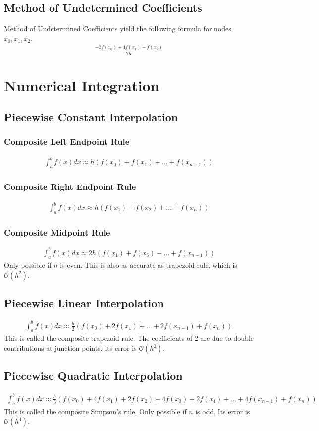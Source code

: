 \documentclass[12pt, letterpaper]{article}
\begin{document}
\subsection{Method of Undetermined Coefficients}
Method of Undetermined Coefficients yield the following formula for nodes $x_0,x_1,x_2$.
\begin{align*}
    \frac{-3f(x_0)+4f(x_1)-f(x_2)}{2h}
\end{align*}

\newpage
\section{Numerical Integration}
\subsection{Piecewise Constant Interpolation}
\subsubsection{Composite Left Endpoint Rule}
\begin{align*}
    \int_{a}^{b}f(x)dx \approx h(f(x_0)+f(x_1)+...+f(x_{n-1}))
\end{align*}
\subsubsection{Composite Right Endpoint Rule}
\begin{align*}
    \int_{a}^{b}f(x)dx \approx h(f(x_1)+f(x_2)+...+f(x_{n}))
\end{align*}
\subsubsection{Composite Midpoint Rule}
\begin{align*}
    \int_{a}^{b}f(x)dx \approx 2h(f(x_1)+f(x_3)+...+f(x_{n-1}))
\end{align*}
Only possible if $n$ is even. This is also as accurate as trapezoid rule, which is $\mathcal{O}(h^2)$.
\subsection{Piecewise Linear Interpolation}
\begin{align*}
    \int_{a}^{b}f(x)dx \approx \frac{h}{2} (f(x_0)+2f(x_1)+...+2f(x_{n-1})+f(x_n))
\end{align*}
This is called the composite trapezoid rule. The coefficients of 2 are due to 
double contributions at junction points. Its error is $\mathcal{O}(h^2)$.
\subsection{Piecewise Quadratic Interpolation}
\begin{align*}
    \int_{a}^{b}f(x)dx \approx \frac{h}{3}(f(x_0)+4f(x_1)+2f(x_2)+4f(x_3)+2f(x_4)+...+4f(x_{n-1})+f(x_n))
\end{align*}
This is called the composite Simpson's rule. Only possible if $n$ is odd. Its error is $\mathcal{O}(h^4)$.
\end{document}

